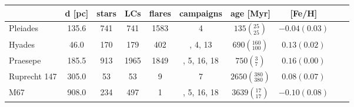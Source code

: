 \begin{tabular}{lccccccccr}
\hline\hline
          &  d [pc] &  stars &   LCs &  flares &    campaigns &                        age [Myr] &         [Fe/H] \\
\hline
 Pleiades &   135.6 &    741 &   741 &    1583 &            4 &     $135\left(_{25}^{25}\right)$ &  $-0.04(0.03)$ \\
   Hyades &    46.0 &    170 &   179 &     402 &      , 4, 13 &   $690\left(_{100}^{160}\right)$ &   $0.13(0.02)$ \\
 Praesepe &   185.5 &    913 &  1965 &    1849 &  , 5, 16, 18 &       $750\left(_{7}^{3}\right)$ &   $0.16(0.00)$ \\
  Ruprecht 147 &   305.0 &     53 &    53 &       9 &            7 &  $2650\left(_{380}^{380}\right)$ &   $0.08(0.07)$ \\
      M67 &   908.0 &    234 &   497 &       1 &  , 5, 16, 18 &    $3639\left(_{17}^{17}\right)$ &  $-0.10(0.08)$ \\
\hline

\end{tabular}
